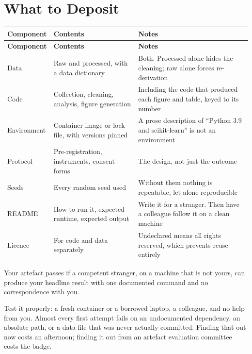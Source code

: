 \section{What to Deposit}

\begin{center}
\small
\begin{longtable}{@{}L{3.0cm}L{4.8cm}L{6.4cm}@{}}
\toprule
\textbf{Component} & \textbf{Contents} & \textbf{Notes} \\
\midrule
\endfirsthead
\toprule
\textbf{Component} & \textbf{Contents} & \textbf{Notes} \\
\midrule
\endhead
\bottomrule
\endfoot
Data
  & Raw and processed, with a data dictionary
  & Both. Processed alone hides the cleaning; raw alone forces re-derivation \\
Code
  & Collection, cleaning, analysis, figure generation
  & Including the code that produced each figure and table, keyed to its number \\
Environment
  & Container image or lock file, with versions pinned
  & A prose description of ``Python 3.9 and scikit-learn'' is not an
    environment \\
Protocol
  & Pre-registration, instruments, consent forms
  & The design, not just the outcome \\
Seeds
  & Every random seed used
  & Without them nothing is repeatable, let alone reproducible \\
README
  & How to run it, expected runtime, expected output
  & Write it for a stranger. Then have a colleague follow it on a clean machine \\
Licence
  & For code and data separately
  & Undeclared means all rights reserved, which prevents reuse entirely \\
\end{longtable}
\end{center}

\begin{alertbox}
Your artefact passes if a competent stranger, on a machine that is not yours,
can produce your headline result with one documented command and no
correspondence with you.

\medskip
Test it properly: a fresh container or a borrowed laptop, a colleague, and no
help from you. Almost every first attempt fails on an undocumented dependency,
an absolute path, or a data file that was never actually committed. Finding
that out now costs an afternoon; finding it out from an artefact evaluation
committee costs the badge.
\end{alertbox}

